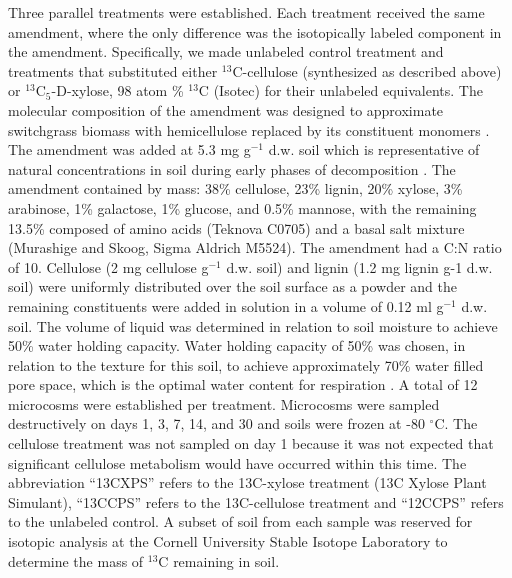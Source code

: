 \documentclass{article}
\begin{document}
Three parallel treatments were established. Each treatment received the same
amendment, where the only difference was the isotopically labeled component in
the amendment. Specifically, we made unlabeled control treatment and treatments
that substituted either $^{13}$C-cellulose (synthesized as described above) or
$^{13}$C$_{5}$-D-xylose, 98 atom \% $^{13}$C (Isotec) for their unlabeled
equivalents. The molecular composition of the amendment was designed to
approximate switchgrass biomass with hemicellulose replaced by its constituent
monomers \citep{Yan_2010,David_2010}. The amendment was added at 5.3 mg
g$^{-1}$ d.w. soil which is representative of natural concentrations in soil
during early phases of decomposition \citep{Schneckenberger_2008}. The
amendment contained by mass: 38\% cellulose, 23\% lignin, 20\% xylose, 3\%
arabinose, 1\% galactose, 1\% glucose, and 0.5\% mannose, with the remaining
13.5\% composed of amino acids (Teknova C0705) and a basal salt mixture
(Murashige and Skoog, Sigma Aldrich M5524). The amendment had a C:N ratio of
10. Cellulose (2 mg cellulose g$^{-1}$ d.w. soil) and lignin (1.2 mg lignin g-1
d.w. soil) were uniformly distributed over the soil surface as a powder and
the remaining constituents were added in solution in a volume of
0.12 ml g$^{-1}$ d.w. soil. The volume of liquid was determined in relation to
soil moisture to achieve 50\% water holding capacity. Water holding capacity
of 50\% was chosen, in relation to the texture for this soil, to achieve
approximately 70\% water filled pore space, which is the optimal water content
for respiration \citep{Linn_1984}. A total of 12 microcosms were established
per treatment. Microcosms were sampled destructively on days 1, 3, 7, 14, and
30 and soils were frozen at -80 $^{\circ}$C. The cellulose treatment was not
sampled on day 1 because it was not expected that significant cellulose
metabolism would have occurred within this time. The abbreviation “13CXPS”
refers to the 13C-xylose treatment (13C Xylose Plant Simulant), “13CCPS”
refers to the 13C-cellulose treatment and “12CCPS” refers to the unlabeled
control. A subset of soil from each sample was reserved for isotopic
analysis at the Cornell University Stable Isotope Laboratory to determine
the mass of $^{13}$C remaining in soil.
\end{document}

